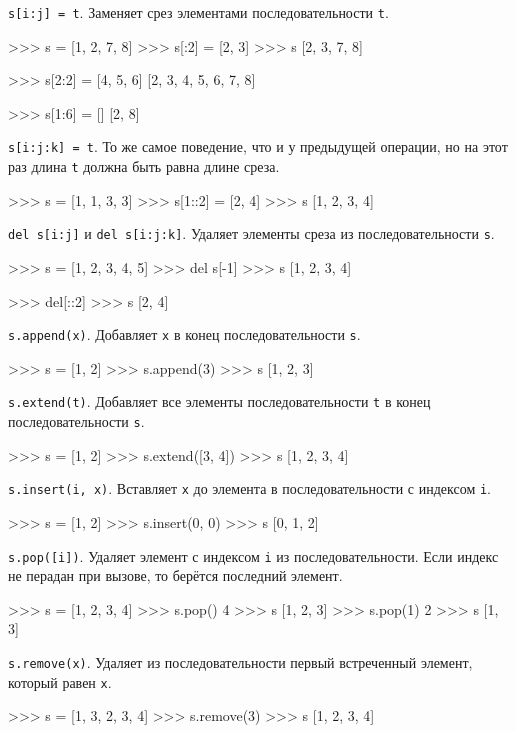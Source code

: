 \lstinline{s[i:j] = t}. Заменяет срез элементами последовательности \lstinline{t}.
\begin{pylst}{}{}
>>> s = [1, 2, 7, 8]
>>> s[:2] = [2, 3]
>>> s
[2, 3, 7, 8]

>>> s[2:2] = [4, 5, 6]
[2, 3, 4, 5, 6, 7, 8]

>>> s[1:6] = []
[2, 8]
\end{pylst}{}

\lstinline{s[i:j:k] = t}. То же самое поведение, что и у предыдущей операции, но на этот раз длина \lstinline{t} должна быть равна длине среза.
\begin{pylst}{}{}
>>> s = [1, 1, 3, 3]
>>> s[1::2] = [2, 4]
>>> s
[1, 2, 3, 4]
\end{pylst}

\lstinline{del s[i:j]} и \lstinline{del s[i:j:k]}. Удаляет элементы среза из последовательности \lstinline{s}.
\begin{pylst}{}{}
>>> s = [1, 2, 3, 4, 5]
>>> del s[-1]
>>> s
[1, 2, 3, 4]

>>> del[::2]
>>> s
[2, 4]
\end{pylst}

\lstinline{s.append(x)}. Добавляет \lstinline{x} в конец последовательности \lstinline{s}.
\begin{pylst}{}{}
>>> s = [1, 2]
>>> s.append(3)
>>> s
[1, 2, 3]
\end{pylst}

\lstinline{s.extend(t)}. Добавляет все элементы последовательности \lstinline{t} в конец последовательности \lstinline{s}.
\begin{pylst}{}{}
>>> s = [1, 2]
>>> s.extend([3, 4])
>>> s
[1, 2, 3, 4]
\end{pylst}

\lstinline{s.insert(i, x)}. Вставляет \lstinline{x} до элемента в последовательности с индексом \lstinline{i}.
\begin{pylst}{}{}
>>> s = [1, 2]
>>> s.insert(0, 0)
>>> s
[0, 1, 2]
\end{pylst}

\lstinline{s.pop([i])}. Удаляет элемент с индексом \lstinline{i} из последовательности. Если индекс не перадан при вызове, то берётся последний элемент.
\begin{pylst}{}{}
>>> s = [1, 2, 3, 4]
>>> s.pop()
4
>>> s
[1, 2, 3]
>>> s.pop(1)
2
>>> s
[1, 3]
\end{pylst}

\lstinline{s.remove(x)}. Удаляет из последовательности первый встреченный элемент, который равен \lstinline{x}.
\begin{pylst}{}{}
>>> s = [1, 3, 2, 3, 4]
>>> s.remove(3)
>>> s
[1, 2, 3, 4]
\end{pylst}

